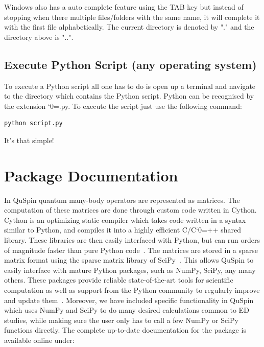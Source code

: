 \documentclass{SciPost}
\newcommand\0{\scalebox{-1}[1]{0}}
\let\svttfamily\ttfamily
\renewcommand\ttfamily{\svttfamily\catcode`0=\active }
\renewcommand\texttt{\bgroup\ttfamily\texttthelp}
\def\texttthelp#1{#1\egroup}
\begin{document}
\begin{appendix}
\begin{itemize}
	\end{itemize}
	Windows also has a auto complete feature using the TAB key but instead of stopping when there multiple files/folders with the same name, it will complete it with the first file alphabetically. The current directory is denoted by "." and the directory above is "..".
	
	\subsection{Execute Python Script (any operating system)}
	To execute a Python script all one has to do is open up a terminal and navigate to the directory which contains the Python script. Python can be recognised by the extension \texttt{.py}. To execute the script just use the following command:
	\begin{lstlisting}[numbers=none,keywordstyle=\ttfamily]
	python script.py
	\end{lstlisting}
	It's that simple!
	
	\newpage
	
	\section{Package Documentation}
	\label{app:doc}
	In QuSpin quantum many-body operators are represented as matrices. The computation of these matrices are done through custom code written in Cython. Cython is an optimizing static compiler which takes code written in a syntax similar to Python, and compiles it into a highly efficient C/C\texttt{++} shared library. These libraries are then easily interfaced with Python, but can run orders of magnitude faster than pure Python code~\cite{Cython}. The matrices are stored in a sparse matrix format using the sparse matrix library of SciPy~\cite{SciPy_package}. This allows QuSpin to easily interface with mature Python packages, such as NumPy, SciPy, any many others. These packages provide reliable state-of-the-art tools for scientific computation as well as support from the Python community to regularly improve and update them~\cite{NumPy,Python_computing_1,Python_computing_2,SciPy_package}. Moreover, we have included specific functionality in QuSpin which uses NumPy and SciPy to do many desired calculations common to ED studies, while making sure the user only has to call a few NumPy or SciPy functions directly. The complete up-to-date documentation for the package is available online under:\\
	

\end{appendix}
\end{document}
